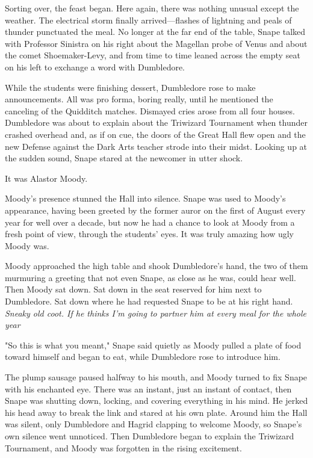 Sorting over, the feast began. Here again, there was nothing unusual except the weather. The electrical storm finally arrived—flashes of lightning and peals of thunder punctuated the meal. No longer at the far end of the table, Snape talked with Professor Sinistra on his right about the Magellan probe of Venus and about the comet Shoemaker-Levy, and from time to time leaned across the empty seat on his left to exchange a word with Dumbledore.

While the students were finishing dessert, Dumbledore rose to make announcements. All was pro forma, boring really, until he mentioned the canceling of the Quidditch matches. Dismayed cries arose from all four houses. Dumbledore was about to explain about the Triwizard Tournament when thunder crashed overhead and, as if on cue, the doors of the Great Hall flew open and the new Defense against the Dark Arts teacher strode into their midst. Looking up at the sudden sound, Snape stared at the newcomer in utter shock.

It was Alastor Moody.

Moody's presence stunned the Hall into silence. Snape was used to Moody's appearance, having been greeted by the former auror on the first of August every year for well over a decade, but now he had a chance to look at Moody from a fresh point of view, through the students' eyes. It was truly amazing how ugly Moody was.

Moody approached the high table and shook Dumbledore's hand, the two of them murmuring a greeting that not even Snape, as close as he was, could hear well. Then Moody sat down. Sat down in the seat reserved for him next to Dumbledore. Sat down where he had requested Snape to be at his right hand. \emph{Sneaky old coot. If he thinks I'm going to partner him at every meal for the whole year{\el}}

"So this is what you meant," Snape said quietly as Moody pulled a plate of food toward himself and began to eat, while Dumbledore rose to introduce him.

The plump sausage paused halfway to his mouth, and Moody turned to fix Snape with his enchanted eye. There was an instant, just an instant of contact, then Snape was shutting down, locking, and covering everything in his mind. He jerked his head away to break the link and stared at his own plate. Around him the Hall was silent, only Dumbledore and Hagrid clapping to welcome Moody, so Snape's own silence went unnoticed. Then Dumbledore began to explain the Triwizard Tournament, and Moody was forgotten in the rising excitement.

